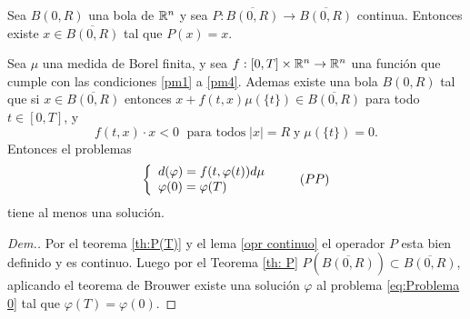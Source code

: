  \begin{thm}
 	
 	Sea $B(0,R)$ una bola de $\mathbb{R}^n$  y sea $P:\overline{B(0,R)}\to \overline{B(0,R)}$ continua. Entonces existe $x \in \overline{B(0,R)}$ tal que $P(x) = x$.
 \end{thm}
 \begin{thm} \label{th:final}
 	Sea $\mu$ una medida de Borel finita, y sea $f:[0,T]\times\mathbb{R}^n\to\mathbb{R}^n$ una función que cumple con las condiciones \ref{pm1} a \ref{pm4}. Ademas existe una bola $B(0,R)$ tal que si $x\in\overline{B(0,R)}$ entonces $x+f(t,x)\mu(\{t\})\in \overline{B(0,R)}$ para todo $t\in[0,T]$, y
 	$$f(t,x)\cdot x<0 \; \text{ para todos}\; |x|=R \;\text{y}\; \mu(\{t\})=0.$$
 	Entonces el problemas
 	 \begin{equation}
 		\left\lbrace \begin{array}{l}
 			d(\varphi)=f(t,\varphi(t))d\mu\\
 			\varphi(0)=\varphi(T)
 		\end{array}\right. \tag{${PP}$}
 	\end{equation} 
tiene al menos una solución. 
\end{thm}
 \begin{proof}[Dem.]
 	Por el teorema \ref{th:P(T)} y el lema  \ref{opr continuo} el operador $P$ esta bien definido y es continuo. Luego por el Teorema \ref{th: P} $P\left( \overline{B(0,R)}\right)\subset\overline{B(0,R)} $, aplicando el teorema de Brouwer existe una solución $\varphi$ al problema \ref{eq:Problema 0} tal que $\varphi(T)=\varphi(0).$
 \end{proof}

